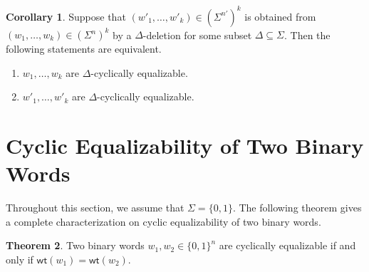 \documentclass{article}
\theoremstyle{definition}
\newtheorem{theorem}{Theorem}[section]
\newtheorem{corollary}[theorem]{Corollary}
\newcommand{\wt}{\mathsf{wt}}
\begin{document}
\begin{corollary}
    \label{cor:equalizability_is_invariant_under_insertion}
    Suppose that $(w'_1,\dots,w'_k)\in (\Sigma^{n'})^k$ is obtained from $(w_1,\dots,w_k)\in (\Sigma^{n})^k$ by a $\Delta$-deletion for some subset $\Delta \subseteq \Sigma$. 
    Then the following statements are equivalent.
    \begin{enumerate}
        \item $w_1,\dots,w_k$ are $\Delta$-cyclically equalizable.
        \item $w'_1,\dots,w'_k$ are $\Delta$-cyclically equalizable.
    \end{enumerate}
\end{corollary}


\section{Cyclic Equalizability of Two Binary Words}

Throughout this section, we assume that $\Sigma = \{0,1\}$.
The following theorem gives a complete characterization on cyclic equalizability of two binary words.

\begin{theorem}
    \label{thm:criterion_for_two_binary_words}
    Two binary words $w_1,w_2 \in \{0,1\}^n$ are cyclically equalizable if and only if $\wt(w_1) = \wt(w_2)$.
\end{theorem}
\end{document}
